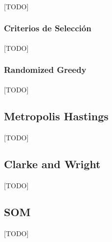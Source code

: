 \documentclass{subfiles}
\begin{document}
        \paragraph{}
        [TODO]

        \subsubsection{Criterios de Selección}
        \label{sec:solving_greedy_criterions}

          \paragraph{}
          [TODO]

        \subsubsection{Randomized Greedy}
        \label{sec:solving_randomized_greedy}

          \paragraph{}
          [TODO]

      \subsection{Metropolis Hastings}
      \label{sec:solving_metropolis}

        \paragraph{}
        [TODO]

      \subsection{Clarke and Wright}
      \label{sec:solving_clarke_and_wright}

        \paragraph{}
        [TODO]

      \subsection{SOM}
      \label{sec:solving_som}

        \paragraph{}
        [TODO]
\end{document}

